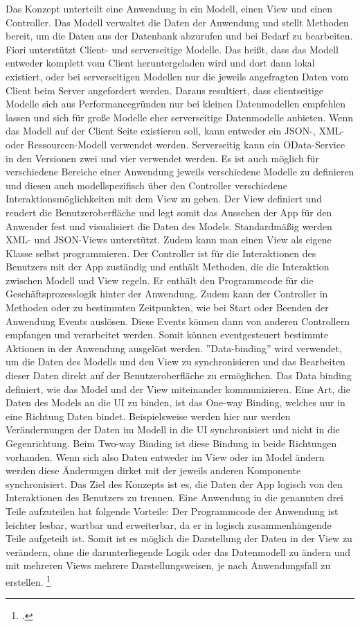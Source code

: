 Das Konzept unterteilt eine Anwendung in ein Modell, einen View und einen Controller. Das Modell verwaltet die Daten der Anwendung und stellt Methoden bereit, um die Daten aus der Datenbank abzurufen und bei Bedarf zu bearbeiten. Fiori unterstützt Client- und serverseitige Modelle. Das hei{\ss}t, dass das Modell entweder komplett vom Client heruntergeladen wird und dort dann lokal existiert, oder bei serverseitigen Modellen nur die jeweils angefragten Daten vom Client beim Server angefordert werden. Daraus resultiert, dass clientseitige Modelle sich aus Performancegründen nur bei kleinen Datenmodellen empfehlen lassen und sich für große Modelle eher serverseitige Datenmodelle anbieten. Wenn das Modell auf der Client Seite existieren soll, kann entweder ein JSON-, XML- oder Ressourcen-Modell verwendet werden. Serverseitig kann ein OData-Service in den Versionen zwei und vier verwendet werden. Es ist auch möglich für verschiedene Bereiche einer Anwendung jeweils verschiedene Modelle zu definieren und diesen auch modellspezifisch über den Controller verschiedene Interaktionsmöglichkeiten mit dem View zu geben. Der View definiert und rendert die Benutzeroberfläche und legt somit das Aussehen der App für den Anwender fest und visualisiert die Daten des Models. Standardmä{\ss}ig werden XML- und JSON-Views unterstützt. Zudem kann man einen View als eigene Klasse selbst programmieren. Der Controller ist für die Interaktionen des Benutzers mit der App zuständig und enthält Methoden, die die Interaktion zwischen Modell und View regeln. Er enthält den Programmcode für die Geschäftsprozesslogik hinter der Anwendung. Zudem kann der Controller in Methoden oder zu bestimmten Zeitpunkten, wie \zB bei Start oder Beenden der Anwendung Events auslösen. Diese Events können dann von anderen Controllern empfangen und verarbeitet werden. Somit können eventgesteuert bestimmte Aktionen in der Anwendung ausgelöst werden. ''Data-binding'' wird verwendet, um die Daten des Modells und den View zu synchronisieren und das Bearbeiten dieser Daten direkt auf der Benutzeroberfläche zu ermöglichen. Das Data binding definiert, wie das Model und der View miteinander kommunizieren. Eine Art, die Daten des Models an die UI zu binden, ist das One-way Binding, welches nur in eine Richtung Daten bindet. Beispielsweise werden hier nur werden Verändernungen der Daten im Modell in die UI synchronisiert und nicht in die Gegenrichtung. Beim Two-way Binding ist diese Bindung in beide Richtungen vorhanden. Wenn sich also Daten entweder im View oder im Model ändern werden diese Änderungen dirket mit der jeweils anderen Komponente synchronisiert. Das Ziel des Konzepts ist es, die Daten der App logisch von den Interaktionen des Benutzers zu trennen. Eine Anwendung in die genannten drei Teile aufzuteilen hat folgende Vorteile: Der Programmcode der Anwendung ist leichter lesbar, wartbar und erweiterbar, da er in logisch zusammenhängende Teile aufgeteilt ist. Somit ist es möglich die Darstellung der Daten in der View zu verändern, ohne die darunterliegende Logik oder das Datenmodell zu ändern und mit mehreren Views mehrere Darstellungsweisen, je nach Anwendungsfall zu erstellen. \footcite[Vgl.][]{sap_sapui5-sap-hel-docu_2023}

